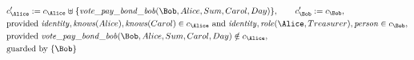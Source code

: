 \begin{align*}
&
c'_
{
\Alice
}
 := 
c_
{
\Alice
}
 \uplus 
\{
\mathit{\detokenize{
vote_pay_bond_bob
}}
(
\Bob
,
Alice
,
Sum
,
Carol
,
Day
)
\}
, \qquad 
c'_
{
\Bob
}
 := 
c_
{
\Bob
}
,\\
&
\text{provided } 
\mathit{\detokenize{
identity
}}
,
\mathit{\detokenize{
knows
}}
(
Alice
)
,
\mathit{\detokenize{
knows
}}
(
Carol
)
 \in c_
{
\Alice
}
 \text{ and } 
\mathit{\detokenize{
identity
}}
,
\mathit{\detokenize{
role
}}
(
\Alice
,
Treasurer
)
,
\mathit{\detokenize{
person
}}
 \in c_
{
\Bob
}
,\\
&
\text{provided } 
\mathit{\detokenize{
vote_pay_bond_bob
}}
(
\Bob
,
Alice
,
Sum
,
Carol
,
Day
)
 \notin c_
{
\Alice
}
,\\
&
\text{guarded by } \{
\Bob
\}
\end{align*}

